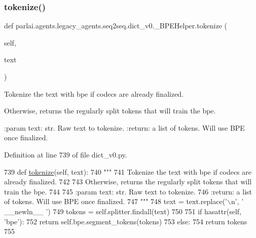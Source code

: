 \mbox{\label{classparlai_1_1agents_1_1legacy__agents_1_1seq2seq_1_1dict__v0_1_1__BPEHelper_a33d5217e263257279fe081b02da95d8d}} 
\subsubsection{\texorpdfstring{tokenize()}{tokenize()}}
{\footnotesize\ttfamily def parlai.\+agents.\+legacy\+\_\+agents.\+seq2seq.\+dict\+\_\+v0.\+\_\+\+B\+P\+E\+Helper.\+tokenize (\begin{DoxyParamCaption}\item[{}]{self,  }\item[{}]{text }\end{DoxyParamCaption})}

\begin{DoxyVerb}Tokenize the text with bpe if codecs are already finalized.

Otherwise, returns the regularly split tokens that will train the bpe.

:param text: str. Raw text to tokenize.
:return: a list of tokens. Will use BPE once finalized.
\end{DoxyVerb}
 

Definition at line 739 of file dict\+\_\+v0.\+py.


\begin{DoxyCode}
739     \textcolor{keyword}{def }\hyperlink{namespaceparlai_1_1agents_1_1tfidf__retriever_1_1build__tfidf_a1fdb457e98eb4e4c26047e229686a616}{tokenize}(self, text):
740         \textcolor{stringliteral}{"""}
741 \textcolor{stringliteral}{        Tokenize the text with bpe if codecs are already finalized.}
742 \textcolor{stringliteral}{}
743 \textcolor{stringliteral}{        Otherwise, returns the regularly split tokens that will train the bpe.}
744 \textcolor{stringliteral}{}
745 \textcolor{stringliteral}{        :param text: str. Raw text to tokenize.}
746 \textcolor{stringliteral}{        :return: a list of tokens. Will use BPE once finalized.}
747 \textcolor{stringliteral}{        """}
748         text = text.replace(\textcolor{stringliteral}{'\(\backslash\)n'}, \textcolor{stringliteral}{' \_\_newln\_\_ '})
749         tokens = self.splitter.findall(text)
750 
751         \textcolor{keywordflow}{if} hasattr(self, \textcolor{stringliteral}{'bpe'}):
752             \textcolor{keywordflow}{return} self.bpe.segment\_tokens(tokens)
753         \textcolor{keywordflow}{else}:
754             \textcolor{keywordflow}{return} tokens
755 
\end{DoxyCode}


